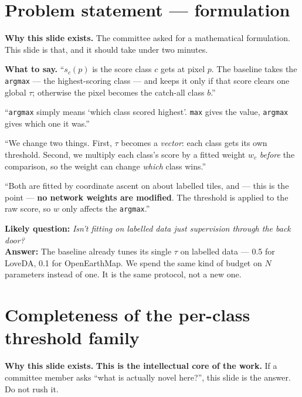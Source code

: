 \documentclass[11pt,a4paper]{article}
\newcommand{\best}[1]{\textcolor{acc}{\textbf{#1}}}
\newcommand{\why}[1]{\par\smallskip\noindent\textbf{Why this slide exists.} #1}
\newcommand{\say}[1]{\par\smallskip\noindent\textbf{What to say.} #1}
\newcommand{\ask}[2]{\par\smallskip\noindent\textbf{Likely question:} \emph{#1}\\
  \textbf{Answer:} #2}
\begin{document}
\section{Problem statement --- formulation}
\why{The committee asked for a mathematical formulation. This slide is that, and
it should take under two minutes.}

\say{``$s_c(p)$ is the score class $c$ gets at pixel $p$. The baseline takes the
\texttt{argmax} --- the highest-scoring class --- and keeps it only if that score
clears one global $\tau$; otherwise the pixel becomes the catch-all class $b$.''

\smallskip
``\texttt{argmax} simply means `which class scored highest'. \texttt{max} gives
the value, \texttt{argmax} gives which one it was.''

\smallskip
``We change two things. First, $\tau$ becomes a \emph{vector}: each class gets
its own threshold. Second, we multiply each class's score by a fitted weight
$w_c$ \emph{before} the comparison, so the weight can change \emph{which} class
wins.''

\smallskip
``Both are fitted by coordinate ascent on about \calibTiles{} labelled tiles, and
--- this is the point --- \best{no network weights are modified}. The threshold
is applied to the raw score, so $w$ only affects the \texttt{argmax}.''}

\ask{Isn't fitting on labelled data just supervision through the back door?}{The
baseline already tunes its single $\tau$ on labelled data --- 0.5 for LoveDA, 0.1
for OpenEarthMap. We spend the same kind of budget on $N$ parameters instead of
one. It is the same protocol, not a new one.}

\section{Completeness of the per-class threshold family}
\why{\best{This is the intellectual core of the work.} If a committee member asks
``what is actually novel here?'', this slide is the answer. Do not rush it.}
\end{document}
